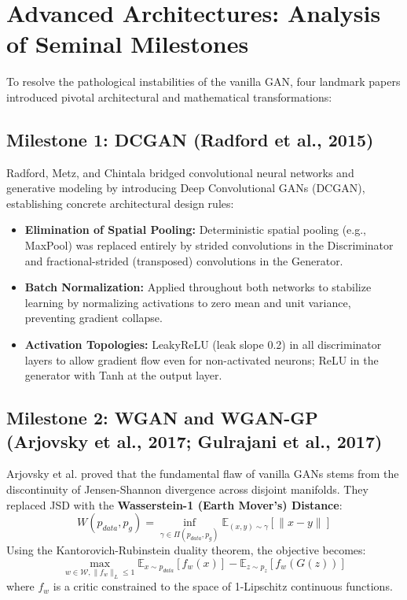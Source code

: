 \documentclass[conference]{IEEEtran}
\begin{document}
\section{Advanced Architectures: Analysis of Seminal Milestones}
To resolve the pathological instabilities of the vanilla GAN, four landmark papers introduced pivotal architectural and mathematical transformations:

\subsection{Milestone 1: DCGAN (Radford et al., 2015)}
Radford, Metz, and Chintala \cite{radford2015unsupervised} bridged convolutional neural networks and generative modeling by introducing Deep Convolutional GANs (DCGAN), establishing concrete architectural design rules:
\begin{itemize}
    \item \textbf{Elimination of Spatial Pooling:} Deterministic spatial pooling (e.g., MaxPool) was replaced entirely by strided convolutions in the Discriminator and fractional-strided (transposed) convolutions in the Generator.
    \item \textbf{Batch Normalization:} Applied throughout both networks to stabilize learning by normalizing activations to zero mean and unit variance, preventing gradient collapse.
    \item \textbf{Activation Topologies:} LeakyReLU (leak slope 0.2) in all discriminator layers to allow gradient flow even for non-activated neurons; ReLU in the generator with Tanh at the output layer.
\end{itemize}

\subsection{Milestone 2: WGAN and WGAN-GP (Arjovsky et al., 2017; Gulrajani et al., 2017)}
Arjovsky et al. \cite{arjovsky2017wasserstein} proved that the fundamental flaw of vanilla GANs stems from the discontinuity of Jensen-Shannon divergence across disjoint manifolds. They replaced JSD with the \textbf{Wasserstein-1 (Earth Mover's) Distance}:
\begin{equation}
W(p_{data}, p_g) = \inf_{\gamma \in \Pi(p_{data}, p_g)} \mathbb{E}_{(x, y) \sim \gamma}[\|x - y\|]
\end{equation}
Using the Kantorovich-Rubinstein duality theorem, the objective becomes:
\begin{equation}
\max_{w \in \mathcal{W}, \|f_w\|_L \le 1} \mathbb{E}_{x \sim p_{data}}[f_w(x)] - \mathbb{E}_{z \sim p_z}[f_w(G(z))]
\end{equation}
where $f_w$ is a critic constrained to the space of 1-Lipschitz continuous functions.
\end{document}
